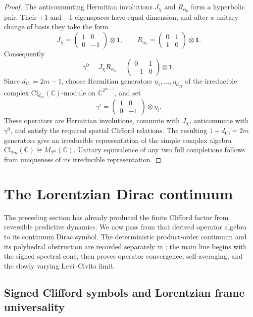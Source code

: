 \documentclass[11pt]{article}
\theoremstyle{definition}
\theoremstyle{remark}
\newcommand{\C}{\mathbb{C}}
\newcommand{\Cl}{\mathrm{Cl}}
\newcommand{\dCl}{d_{\mathrm{Cl}}}
\newcommand{\one}{\mathbf{1}}
\begin{document}
\begin{proof}
The anticommuting Hermitian involutions
\(J_\chi\) and \(R_{\alpha_0}\) form a hyperbolic pair.  Their \(+1\) and
\(-1\) eigenspaces have equal dimension, and after a unitary change of basis
they take the form
\[
  J_\chi=
  \begin{pmatrix}1&0\\0&-1\end{pmatrix}\otimes\one,
  \qquad
  R_{\alpha_0}=
  \begin{pmatrix}0&1\\1&0\end{pmatrix}\otimes\one.
\]
Consequently
\[
  \gamma^0=J_\chi R_{\alpha_0}
  =
  \begin{pmatrix}0&1\\-1&0\end{pmatrix}\otimes\one.
\]
Since \(\dCl=2m-1\), choose Hermitian generators
\(\eta_1,\ldots,\eta_{\dCl}\) of the irreducible complex
\(\Cl_{\dCl}(\C)\)-module on \(\C^{2^{m-1}}\), and set
\[
  \gamma^i=
  \begin{pmatrix}1&0\\0&-1\end{pmatrix}\otimes\eta_i.
\]
These operators are Hermitian involutions, commute with \(J_\chi\),
anticommute with \(\gamma^0\), and satisfy the required spatial Clifford
relations.  The resulting \(1+\dCl=2m\) generators give an irreducible
representation of the simple complex algebra
\(\Cl_{2m}(\C)\cong M_{2^m}(\C)\).  Unitary equivalence of any two full
completions follows from uniqueness of its irreducible representation.
\end{proof}


\section{The Lorentzian Dirac continuum}
\label{sec:lorentzian}

The preceding section has already produced the finite Clifford factor from
reversible predictive dynamics.  We now pass from that derived operator algebra
to its continuum Dirac symbol.  The deterministic product-order continuum and
its polyhedral obstruction are recorded separately in
; the main line begins with the signed spectral cone,
then proves operator convergence, self-averaging, and the slowly varying
Levi--Civita limit.

\subsection{Signed Clifford symbols and Lorentzian frame universality}
\label{sec:isotropisation}
\end{document}

